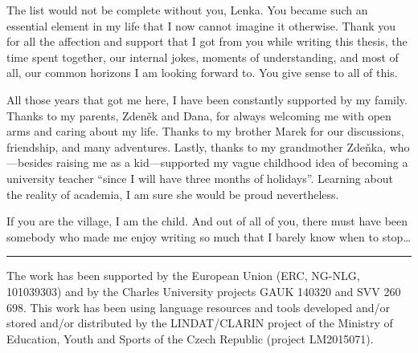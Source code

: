 \documentclass[12pt,notitlepage,a4paper,openright]{report}
\begin{document}
{    The list would not be complete without you, Lenka. You became such an essential element in my life that I now cannot imagine it otherwise. Thank you for all the affection and support that I got from you while writing this thesis, the time spent together, our internal jokes, moments of understanding, and most of all, our common horizons I am looking forward to. You give sense to all of this.

    All those years that got me here, I have been constantly supported by my family. Thanks to my parents, Zdeněk and Dana, for always welcoming me with open arms and caring about my life. Thanks to my brother Marek for our discussions, friendship, and many adventures. Lastly, thanks to my grandmother Zdeňka, who---besides raising me as a kid---supported my vague childhood idea of becoming a university teacher ``since I will have three months of holidays''. Learning about the reality of academia, I am sure she would be proud nevertheless.


    \vspace{1\baselineskip}
    \noindent If you are the village, I am the child. And out of all of you, there must have been somebody who made me enjoy writing so much that I barely know when to stop\ldots


}

\vfill


{\noindent\footnotesize %
    \par\noindent\rule{\textwidth}{0.4pt}
    The work has been supported by the European Union (ERC, NG-NLG, 101039303) and by the Charles University projects GAUK 140320 and SVV 260 698. This work has been using language resources and tools developed and/or stored and/or distributed by the  LINDAT/CLARIN project of the Ministry of Education, Youth and Sports of the Czech Republic (project LM2015071).
}

\cleardoublepage{}
\tableofcontents %

\cleardoublepage{}
\renewcommand{\chapterheadstartvskip}{\vspace*{-10mm}} %

%
%
\renewcommand{\thepage}{\arabic{page}}
\setcounter{page}{1}




\sloppy







\end{document}

